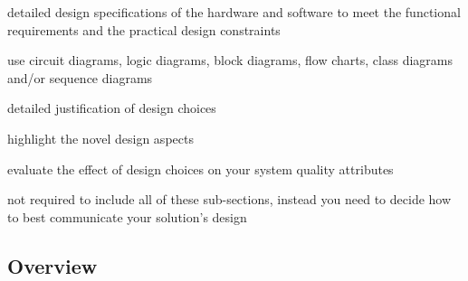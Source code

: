 \documentclass[../main.tex]{subfiles}
\begin{document}
\begin{newrequirements}
    \begin{todolist}
        \item detailed design specifications of the 
            hardware and software to meet the 
            functional requirements and the 
            practical design constraints 

        \item use circuit diagrams, logic diagrams, 
            block diagrams, flow charts, class 
            diagrams and/or sequence diagrams 

        \item detailed justification of design 
            choices 

        \item highlight the novel design aspects 

        \item evaluate the effect of design choices 
            on your system quality attributes 

        \item not required to include all of these 
            sub-sections, instead you need to 
            decide how to best communicate your 
            solution’s design
    \end{todolist}
\end{newrequirements}

\subsection{Overview}



\end{document}
